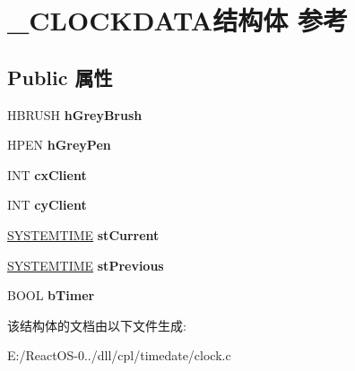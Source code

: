 \hypertarget{struct___c_l_o_c_k_d_a_t_a}{}\section{\+\_\+\+C\+L\+O\+C\+K\+D\+A\+T\+A结构体 参考}
\label{struct___c_l_o_c_k_d_a_t_a}
\subsection*{Public 属性}
\begin{DoxyCompactItemize}
\item 
\mbox{\label{struct___c_l_o_c_k_d_a_t_a_adc30e5bb600ac8248b062fee59f80c94}} 
H\+B\+R\+U\+SH {\bfseries h\+Grey\+Brush}
\item 
\mbox{\label{struct___c_l_o_c_k_d_a_t_a_a75b2aee22e1ade53b7877d9c5d476070}} 
H\+P\+EN {\bfseries h\+Grey\+Pen}
\item 
\mbox{\label{struct___c_l_o_c_k_d_a_t_a_a7cca5de87e52e655fecd6b1d27d01e82}} 
I\+NT {\bfseries cx\+Client}
\item 
\mbox{\label{struct___c_l_o_c_k_d_a_t_a_a996b03219001590cafe60da1d79e916a}} 
I\+NT {\bfseries cy\+Client}
\item 
\mbox{\label{struct___c_l_o_c_k_d_a_t_a_acb61156ff02a4d24a93a1fbd50d1ff8b}} 
\hyperlink{struct___s_y_s_t_e_m_t_i_m_e}{S\+Y\+S\+T\+E\+M\+T\+I\+ME} {\bfseries st\+Current}
\item 
\mbox{\label{struct___c_l_o_c_k_d_a_t_a_afec4bdfd71688042632d562991a4d447}} 
\hyperlink{struct___s_y_s_t_e_m_t_i_m_e}{S\+Y\+S\+T\+E\+M\+T\+I\+ME} {\bfseries st\+Previous}
\item 
\mbox{\label{struct___c_l_o_c_k_d_a_t_a_a8b0657c648870bba2128b70643bf4f1e}} 
B\+O\+OL {\bfseries b\+Timer}
\end{DoxyCompactItemize}


该结构体的文档由以下文件生成\+:\begin{DoxyCompactItemize}
\item 
E\+:/\+React\+O\+S-\/0../dll/cpl/timedate/clock.\+c\end{DoxyCompactItemize}
